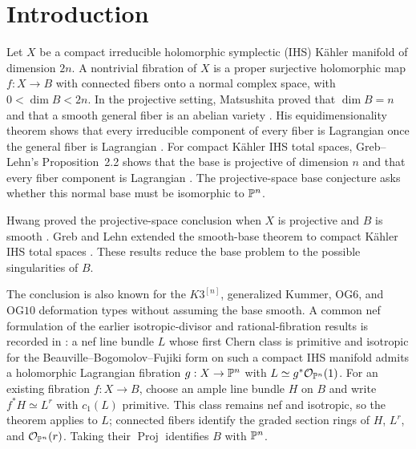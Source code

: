 \section{Introduction}\label{sec:introduction}

Let \(X\) be a compact irreducible holomorphic symplectic (IHS) Kähler
manifold of dimension \(2n\). A nontrivial fibration of \(X\) is a proper
surjective holomorphic map \(f:X\to B\) with connected fibers onto a normal
complex space, with \(0<\dim B<2n\). In the projective setting, Matsushita
proved that \(\dim B=n\) and that a smooth general fiber is an abelian
variety \cite{Matsushita1999,Matsushita2001}. His equidimensionality theorem
shows that every irreducible component of every fiber is Lagrangian once
the general fiber is Lagrangian \cite[Theorem~1]{Matsushita2000}.
For compact Kähler IHS total spaces, Greb--Lehn's Proposition~2.2 shows
that the base is projective of dimension \(n\) and that every fiber
component is Lagrangian \cite{GrebLehn2014}. The projective-space base conjecture asks
whether this normal base must be isomorphic to \(\mathbb P^n\).

Hwang proved the projective-space conclusion when \(X\) is projective and
\(B\) is smooth \cite[Theorem~1.2]{Hwang2008}. Greb and Lehn extended the
smooth-base theorem to compact Kähler IHS total spaces
\cite[Theorem~1.1]{GrebLehn2014}. These results reduce the base problem to
the possible singularities of \(B\).

The conclusion is also known for the \(K3^{[n]}\), generalized Kummer,
\(\mathrm{OG6}\), and \(\mathrm{OG10}\) deformation types without assuming
the base smooth. A common nef formulation of the earlier isotropic-divisor
and rational-fibration results is recorded in
\cite[Theorem~1.3]{DebarreHuybrechtsMacriVoisin2024}: a nef line bundle \(L\)
whose first Chern class is primitive and isotropic for the
Beauville--Bogomolov--Fujiki form on such a compact IHS manifold
admits a holomorphic Lagrangian fibration \(g:X\to\mathbb P^n\) with
\(L\simeq g^*\mathcal O_{\mathbb P^n}(1)\). For an existing fibration \(f:X\to B\), choose
an ample line bundle \(H\) on \(B\) and write \(f^*H\simeq L^r\) with
\(c_1(L)\) primitive. This class remains nef and isotropic, so the theorem
applies to \(L\); connected fibers identify
the graded section rings of \(H\), \(L^r\), and \(\mathcal O_{\mathbb P^n}(r)\).
Taking their \(\operatorname{Proj}\) identifies \(B\) with \(\mathbb P^n\).

